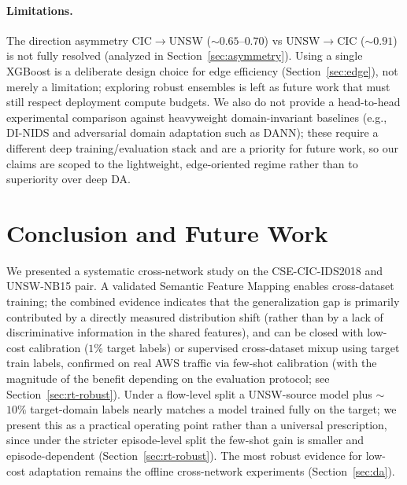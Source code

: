 \documentclass[preprint,12pt,authoryear]{elsarticle}
\begin{document}
\paragraph{Limitations.} The direction asymmetry CIC$\rightarrow$UNSW
($\sim 0.65$--$0.70$) vs UNSW$\rightarrow$CIC ($\sim 0.91$) is not fully resolved
(analyzed in Section~\ref{sec:asymmetry}). Using a single XGBoost is a deliberate
design choice for edge efficiency (Section~\ref{sec:edge}), not merely a
limitation; exploring robust ensembles is left as future work that must still
respect deployment compute budgets. We also do not provide a head-to-head
experimental comparison against heavyweight domain-invariant baselines
(e.g., DI-NIDS \citep{layeghy} and adversarial domain adaptation such as DANN);
these require a different deep training/evaluation stack and are a priority for
future work, so our claims are scoped to the lightweight, edge-oriented regime
rather than to superiority over deep DA.

\FloatBarrier

\section{Conclusion and Future Work}
\label{sec:conclusion}

We presented a systematic cross-network study on the CSE-CIC-IDS2018 and UNSW-NB15
pair. A validated Semantic Feature Mapping enables cross-dataset training; the
combined evidence indicates that the generalization gap is primarily contributed by
a directly measured distribution shift (rather than by a lack of discriminative
information in the shared features), and can be closed with low-cost calibration
($1\%$ target labels) or supervised cross-dataset mixup using target train labels,
confirmed on real AWS traffic via few-shot calibration (with the magnitude of the
benefit depending on the evaluation protocol; see Section~\ref{sec:rt-robust}). Under
a flow-level split a UNSW-source model plus $\sim$$10\%$ target-domain labels nearly
matches a model trained fully on the target; we present this as a practical operating
point rather than a universal prescription, since under the stricter episode-level
split the few-shot gain is smaller and episode-dependent (Section~\ref{sec:rt-robust}).
The most robust evidence for low-cost adaptation remains the offline cross-network
experiments (Section~\ref{sec:da}).
\end{document}
